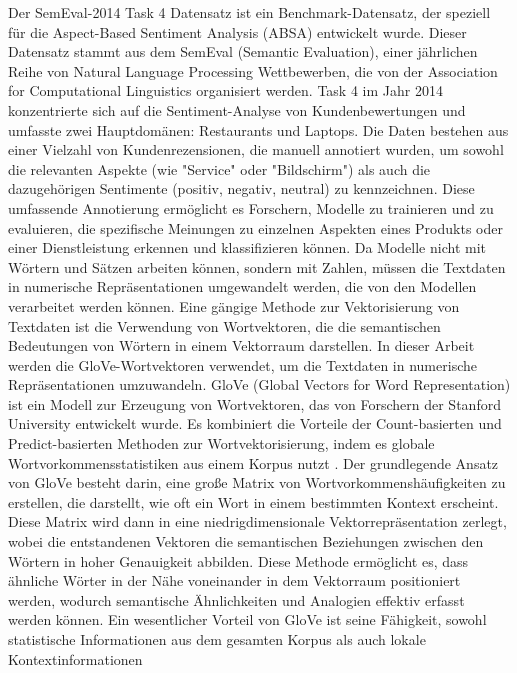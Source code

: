 \documentclass[12pt]{article}
\begin{document}
Der SemEval-2014 Task 4 Datensatz ist ein Benchmark-Datensatz, der speziell für die Aspect-Based Sentiment Analysis (ABSA) entwickelt wurde. Dieser Datensatz stammt aus dem SemEval (Semantic Evaluation), einer jährlichen Reihe von Natural Language Processing Wettbewerben, die von der Association for Computational Linguistics organisiert werden. Task 4 im Jahr 2014 konzentrierte sich auf die Sentiment-Analyse von Kundenbewertungen und umfasste zwei Hauptdomänen: Restaurants und Laptops. Die Daten bestehen aus einer Vielzahl von Kundenrezensionen, die manuell annotiert wurden, um sowohl die relevanten Aspekte (wie "Service" oder "Bildschirm") als auch die dazugehörigen Sentimente (positiv, negativ, neutral) zu kennzeichnen. Diese umfassende Annotierung ermöglicht es Forschern, Modelle zu trainieren und zu evaluieren, die spezifische Meinungen zu einzelnen Aspekten eines Produkts oder einer Dienstleistung erkennen und klassifizieren können.
\newline
\newline
Da Modelle nicht mit Wörtern und Sätzen arbeiten können, sondern mit Zahlen, müssen die Textdaten in numerische Repräsentationen umgewandelt werden, die von den Modellen verarbeitet werden können. Eine gängige Methode zur Vektorisierung von Textdaten ist die Verwendung von Wortvektoren, die die semantischen Bedeutungen von Wörtern in einem Vektorraum darstellen. In dieser Arbeit werden die GloVe-Wortvektoren verwendet, um die Textdaten in numerische Repräsentationen umzuwandeln.
GloVe (Global Vectors for Word Representation) ist ein Modell zur Erzeugung von Wortvektoren, das von Forschern der Stanford University entwickelt wurde. Es kombiniert die Vorteile der Count-basierten und Predict-basierten Methoden zur Wortvektorisierung, indem es globale Wortvorkommensstatistiken aus einem Korpus nutzt \cite{pennington2014glove}. Der grundlegende Ansatz von GloVe besteht darin, eine große Matrix von Wortvorkommenshäufigkeiten zu erstellen, die darstellt, wie oft ein Wort in einem bestimmten Kontext erscheint. Diese Matrix wird dann in eine niedrigdimensionale Vektorrepräsentation zerlegt, wobei die entstandenen Vektoren die semantischen Beziehungen zwischen den Wörtern in hoher Genauigkeit abbilden. Diese Methode ermöglicht es, dass ähnliche Wörter in der Nähe voneinander in dem Vektorraum positioniert werden, wodurch semantische Ähnlichkeiten und Analogien effektiv erfasst werden können.
\newline
\newline
Ein wesentlicher Vorteil von GloVe ist seine Fähigkeit, sowohl statistische Informationen aus dem gesamten Korpus als auch lokale Kontextinformationen 
\end{document}
